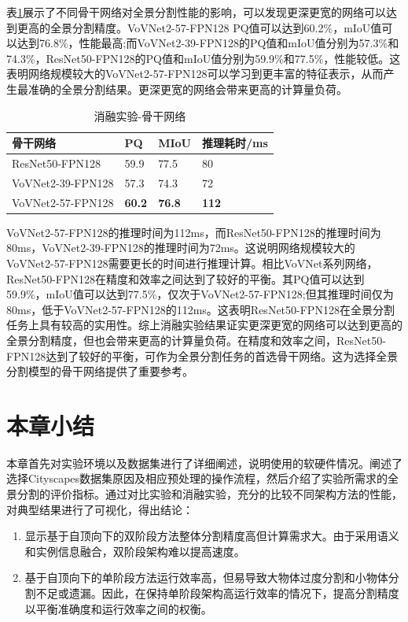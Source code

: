 表\cref*{tab:3.3.9}展示了不同骨干网络对全景分割性能的影响，可以发现更深更宽的网络可以达到更高的全景分割精度。VoVNet2-57-FPN128 PQ值可以达到60.2\%，mIoU值可以达到76.8\%，性能最高;而VoVNet2-39-FPN128的PQ值和mIoU值分别为57.3\%和74.3\%，ResNet50-FPN128的PQ值和mIoU值分别为59.9\%和77.5\%，性能较低。这表明网络规模较大的VoVNet2-57-FPN128可以学习到更丰富的特征表示，从而产生最准确的全景分割结果。更深更宽的网络会带来更高的计算量负荷。
\begin{table}[]
    \centering
    \caption*{消融实验-骨干网络}
    \begin{tabular}{llll}
        \toprule
        骨干网络              & PQ            & MIoU          & 推理耗时/ms      \\ \midrule
        ResNet50-FPN128   & 59.9          & 77.5          & 80           \\
        VoVNet2-39-FPN128 & 57.3          & 74.3          & 72           \\
        VoVNet2-57-FPN128 & \textbf{60.2} & \textbf{76.8} & \textbf{112} \\ \bottomrule
    \end{tabular}
    \label{tab:3.3.9}
\end{table}
VoVNet2-57-FPN128的推理时间为112ms，而ResNet50-FPN128的推理时间为80ms，VoVNet2-39-FPN128的推理时间为72ms。这说明网络规模较大的VoVNet2-57-FPN128需要更长的时间进行推理计算。相比VoVNet系列网络，ResNet50-FPN128在精度和效率之间达到了较好的平衡。其PQ值可以达到59.9\%，mIoU值可以达到77.5\%，仅次于VoVNet2-57-FPN128;但其推理时间仅为80ms，低于VoVNet2-57-FPN128的112ms。这表明ResNet50-FPN128在全景分割任务上具有较高的实用性。综上消融实验结果证实更深更宽的网络可以达到更高的全景分割精度，但也会带来更高的计算量负荷。在精度和效率之间，ResNet50-FPN128达到了较好的平衡，可作为全景分割任务的首选骨干网络。这为选择全景分割模型的骨干网络提供了重要参考。



\section{本章小结}
本章首先对实验环境以及数据集进行了详细阐述，说明使用的软硬件情况。阐述了选择Cityscapes数据集原因及相应预处理的操作流程，然后介绍了实验所需求的全景分割的评价指标。通过对比实验和消融实验，充分的比较不同架构方法的性能，对典型结果进行了可视化，得出结论：

\begin{enumerate}
    \item 显示基于自顶向下的双阶段方法整体分割精度高但计算需求大。由于采用语义和实例信息融合，双阶段架构难以提高速度。
    \item 基于自顶向下的单阶段方法运行效率高，但易导致大物体过度分割和小物体分割不足或遗漏。因此，在保持单阶段架构高运行效率的情况下，提高分割精度以平衡准确度和运行效率之间的权衡。
\end{enumerate}


